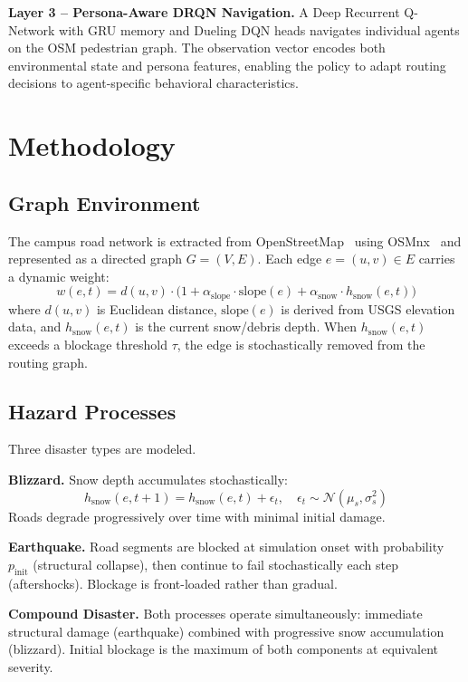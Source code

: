 \documentclass[11pt]{article}
\begin{document}
\textbf{Layer 3 -- Persona-Aware DRQN Navigation.} A Deep Recurrent Q-Network with GRU memory and Dueling DQN heads navigates individual agents on the OSM pedestrian graph. The observation vector encodes both environmental state and persona features, enabling the policy to adapt routing decisions to agent-specific behavioral characteristics.

\section{Methodology}

\subsection{Graph Environment}

The campus road network is extracted from OpenStreetMap~\cite{osm} using OSMnx~\cite{osmnx} and represented as a directed graph $G = (V, E)$. Each edge $e = (u,v) \in E$ carries a dynamic weight:
\[
  w(e, t) = d(u,v) \cdot \bigl(1 + \alpha_{\mathrm{slope}} \cdot \mathrm{slope}(e) + \alpha_{\mathrm{snow}} \cdot h_{\mathrm{snow}}(e, t)\bigr)
\]
where $d(u,v)$ is Euclidean distance, $\mathrm{slope}(e)$ is derived from USGS elevation data, and $h_{\mathrm{snow}}(e,t)$ is the current snow/debris depth. When $h_{\mathrm{snow}}(e,t)$ exceeds a blockage threshold $\tau$, the edge is stochastically removed from the routing graph.

\subsection{Hazard Processes}

Three disaster types are modeled.

\textbf{Blizzard.} Snow depth accumulates stochastically:
\[
  h_{\mathrm{snow}}(e, t+1) = h_{\mathrm{snow}}(e, t) + \epsilon_t, \quad \epsilon_t \sim \mathcal{N}(\mu_s, \sigma_s^2)
\]
Roads degrade progressively over time with minimal initial damage.

\textbf{Earthquake.} Road segments are blocked at simulation onset with probability $p_{\mathrm{init}}$ (structural collapse), then continue to fail stochastically each step (aftershocks). Blockage is front-loaded rather than gradual.

\textbf{Compound Disaster.} Both processes operate simultaneously: immediate structural damage (earthquake) combined with progressive snow accumulation (blizzard). Initial blockage is the maximum of both components at equivalent severity.
\end{document}
